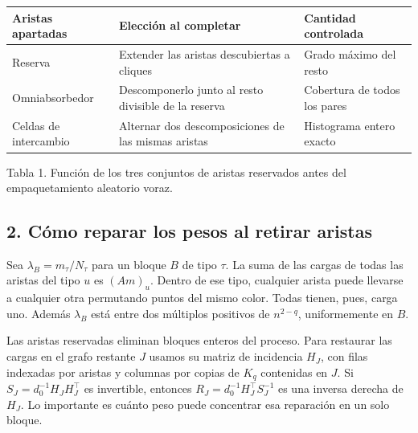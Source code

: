 \documentclass[spanish,11pt,a4paper]{article}
\newcounter{none}
\begin{document}
{\def\LTcaptype{none} %
\begin{longtable}[]{@{}
  >{\raggedright\arraybackslash}p{}
  >{\raggedright\arraybackslash}p{}
  >{\raggedright\arraybackslash}p{}@{}}
\toprule\noalign{}
\begin{minipage}[b]{\linewidth}\raggedright
Aristas apartadas
\end{minipage} & \begin{minipage}[b]{\linewidth}\raggedright
Elección al completar
\end{minipage} & \begin{minipage}[b]{\linewidth}\raggedright
Cantidad controlada
\end{minipage} \\
\midrule\noalign{}
\endhead
\bottomrule\noalign{}
\endlastfoot
Reserva & Extender las aristas descubiertas a cliques & Grado máximo del resto \\
Omniabsorbedor & Descomponerlo junto al resto divisible de la reserva & Cobertura de todos los pares \\
Celdas de intercambio & Alternar dos descomposiciones de las mismas aristas & Histograma entero exacto \\
\end{longtable}
}

Tabla 1. Función de los tres conjuntos de aristas reservados antes del empaquetamiento aleatorio voraz.

\subsection{2. Cómo reparar los pesos al retirar aristas}\label{cuxf3mo-reparar-los-pesos-al-retirar-aristas}

Sea \(\lambda_B=m_\tau/N_\tau\) para un bloque \(B\) de tipo \(\tau\). La suma de las cargas de todas las aristas del tipo \(u\) es \((Am)_u\). Dentro de ese tipo, cualquier arista puede llevarse a cualquier otra permutando puntos del mismo color. Todas tienen, pues, carga uno. Además \(\lambda_B\) está entre dos múltiplos positivos de \(n^{2-q}\), uniformemente en \(B\).

Las aristas reservadas eliminan bloques enteros del proceso. Para restaurar las cargas en el grafo restante \(J\) usamos su matriz de incidencia \(H_J\), con filas indexadas por aristas y columnas por copias de \(K_q\) contenidas en \(J\). Si \(S_J=d_0^{-1}H_JH_J^\top\) es invertible, entonces \(R_J=d_0^{-1}H_J^\top S_J^{-1}\) es una inversa derecha de \(H_J\). Lo importante es cuánto peso puede concentrar esa reparación en un solo bloque.
\end{document}
